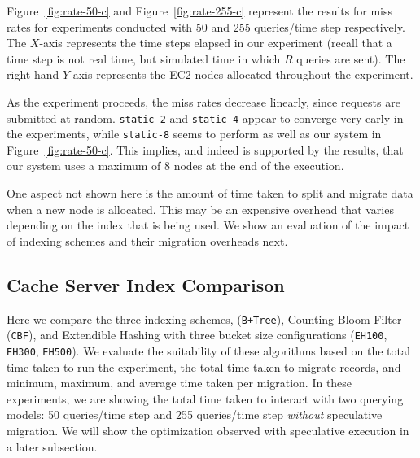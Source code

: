 Figure~\ref{fig:rate-50-c} and Figure~\ref{fig:rate-255-c} represent the
results for miss rates for experiments conducted with 50 and 255 queries/time
step respectively. The $X$-axis represents the time steps elapsed in our
experiment (recall that a time step is not real time, but simulated time in
which $R$ queries are sent). The right-hand $Y$-axis represents the EC2 nodes
allocated throughout the experiment.

As the experiment proceeds, the miss rates decrease linearly, since requests
are submitted at random. {\tt static-2} and {\tt static-4} appear to converge
very early in the experiments, while {\tt static-8} seems to perform as well as
our system in Figure~\ref{fig:rate-50-c}. This implies, and indeed is supported
by the results, that our system uses a maximum of 8 nodes at the end of the
execution.

One aspect not shown here is the amount of time taken to split and migrate data
when a new node is allocated. This may be an expensive overhead that varies
depending on the index that is being used. We show an evaluation of the impact
of indexing schemes and their migration overheads next.


\subsection{Cache Server Index Comparison} %
\label{sub:index_comparison}
Here we compare the three indexing schemes, \bptrees ({\tt B+Tree}), Counting
Bloom Filter ({\tt CBF}), and Extendible Hashing with three bucket size
configurations ({\tt EH100}, {\tt EH300}, {\tt EH500}). We evaluate the
suitability of these algorithms based on the total time taken to run the
experiment, the total time taken to migrate records, and minimum, maximum, and
average time taken per migration. In these experiments, we are showing the
total time taken to interact with two querying models: 50 queries/time step and
255 queries/time step \emph{without} speculative migration. We will show the
optimization observed with speculative execution in a later subsection.

